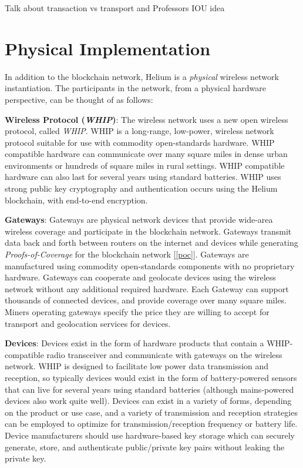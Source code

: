 \documentclass[letterpaper,11pt]{article}
\begin{document}
Talk about transaction vs transport and Professors IOU idea

\newpage

\section{Physical Implementation}

In addition to the blockchain network, Helium is a \emph{physical} wireless network instantiation. The participants in the network, from a physical hardware perspective, can be thought of as follows:

\textbf{Wireless Protocol (\emph{WHIP})}: The wireless network uses a new open wireless protocol, called \emph{WHIP}. WHIP is a long-range, low-power, wireless network protocol suitable for use with commodity open-standards hardware. WHIP compatible hardware can communicate over many square miles in dense urban environments or hundreds of square miles in rural settings. WHIP compatible hardware can also last for several years using standard batteries. WHIP uses strong public key cryptography and authentication occurs using the Helium blockchain, with end-to-end encryption.

\textbf{Gateways}: Gateways are physical network devices that provide wide-area wireless coverage and participate in the blockchain network. Gateways transmit data back and forth between routers on the internet and devices while generating \emph{Proofs-of-Coverage} for the blockchain network [\ref{poc}]. Gateways are manufactured using commodity open-standards components with no proprietary hardware. Gateways can cooperate and geolocate devices using the wireless network without any additional required hardware. Each Gateway can support thousands of connected devices, and provide coverage over many square miles. Miners operating gateways specify the price they are willing to accept for transport and geolocation services for devices.

\textbf{Devices}: Devices exist in the form of hardware products that contain a WHIP-compatible radio transceiver and communicate with gateways on the wireless network. WHIP is designed to facilitate low power data transmission and reception, so typically devices would exist in the form of battery-powered sensors that can live for several years using standard batteries (although mains-powered devices also work quite well). Devices can exist in a variety of forms, depending on the product or use case, and a variety of transmission and reception strategies can be employed to optimize for transmission/reception frequency or battery life. Device manufacturers should use hardware-based key storage which can securely generate, store, and authenticate public/private key pairs without leaking the private key.
\end{document}
